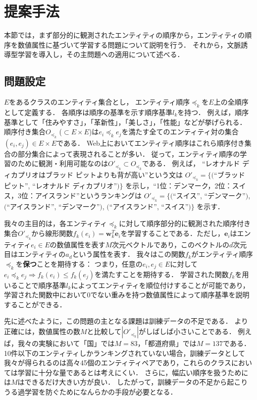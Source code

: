 \chapter{提案手法}
\label{sq:Methodology}

本節では，まず部分的に観測されたエンティティの順序から，エンティティの順序を数値属性に基づいて学習する問題について説明を行う．
それから，文脈誘導型学習を導入し，その主問題への適用について述べる．

\section{問題設定}

$E$をあるクラスのエンティティ集合とし，
エンティティ順序$\preceq_{k}$を$E$上の全順序として定義する．
各順序は順序の基準を示す順序基準$l_k$を持つ．
例えば，順序基準として「住みやすさ」，「革新性」，「美しさ」，「性能」などが挙げられる．
順序付き集合$O_{\preceq_{k}}$ ($\subset E \times E$)は$e_i \preceq_{k} e_j$を満たす全てのエンティティ対の集合$(e_i, e_j) \in E \times E$である．
Web上においてエンティティ順序はこれら順序付き集合の部分集合によって表現されることが多い．
従って，エンティティ順序の学習のために観測・利用可能なのは$O'_{\preceq_{k}} \subset O_{\preceq_{k}}$である．
例えば， ``レオナルド ディカプリオはブラッド ピットよりも背が高い''という文は
$O'_{\preceq_{k}} = \{($``ブラッド ピット'', ``レオナルド ディカプリオ''$)\}$
を示し，``1位：デンマーク，2位：スイス，3位：アイスランド''というランキングは
$O'_{\preceq_{k}} = \{($``スイス'', ``デンマーク''$)$,
$($``アイスランド'', ``デンマーク''$)$, $($``アイスランド'', ``スイス''$)\}$
を示す．

我々の主目的は，各エンティティ$\preceq_{k}$に対して順序部分的に観測された順序付き集合$O'_{\preceq_{k}}$から線形関数$f_k(e_i) = {\mathbf w}_{k}^T {\mathbf e}_i$を学習することである．ただし，${\mathbf e}_i$はエンティティ$e_i \in E$の数値属性を表す$M$次元ベクトルであり，このベクトルの$d$次元目はエンティティの$a_d$という属性を表す．
我々はこの関数$f_k$がエンティティ順序$\preceq_{k}$を{\bf 保つ}ことを期待する：
つまり，任意の$e_i, e_j \in E$に対して$e_i \preceq_{k} e_j \Rightarrow f_k(e_i) \leq f_k(e_j)$を満たすことを期待する．
学習された関数$f_k$を用いることで順序基準$l_k$によってエンティティを順位付けすることが可能であり，学習された関数中において0でない重みを持つ数値属性によって順序基準を説明することができる．

先に述べたように，この問題の主となる課題は訓練データの不足である．
より正確には，数値属性の数$M$と比較して$|O'_{\preceq_{k}}|$がしばしば小さいことである．
例えば，我々の実験において「国」では$M=83$，「都道府県」では$M=137$である．
10件以下のエンティティしかランキングされていない場合，訓練データとして我々が得られるのは高々45個のエンティティペアであり，これらのクラスにおいては学習に十分な量であるとは考えにくい．
さらに，幅広い順序を扱うためには$M$はできるだけ大きい方が良い．
したがって，訓練データの不足から起こりうる過学習を防ぐためになんらかの手段が必要となる．

